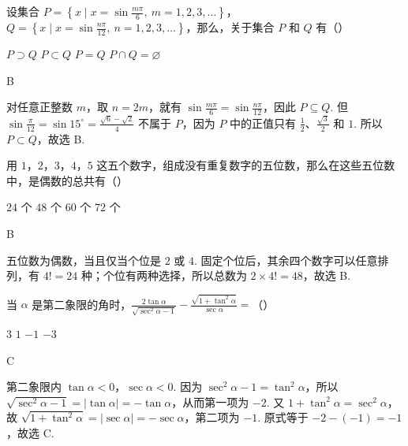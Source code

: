 \begin{problem}
设集合 \(P = \left\{x \mid x = \sin \frac{m\pi}{6},\ m = 1,2,3,\dots\right\}\)，\(Q = \left\{x \mid x = \sin \frac{n\pi}{12},\ n = 1,2,3,\dots\right\}\)，那么，关于集合 \(P\) 和 \(Q\) 有（\quad）

\choices
    {\(P \supset Q\)}
    {\(P \subset Q\)}
    {\(P = Q\)}
    {\(P \cap Q = \varnothing\)}
\end{problem}

\begin{answer}
B
\end{answer}

\begin{solution}
对任意正整数 \(m\)，取 \(n=2m\)，就有 \(\sin\frac{m\pi}{6}=\sin\frac{n\pi}{12}\)，因此 \(P\subseteq Q\). 但 \(\sin\frac{\pi}{12}=\sin15^\circ=\frac{\sqrt6-\sqrt2}{4}\) 不属于 \(P\)，因为 \(P\) 中的正值只有 \(\frac12\)、\(\frac{\sqrt3}{2}\) 和 \(1\). 所以 \(P\subset Q\)，故选 B.
\end{solution}

\begin{problem}
用 \(1\)，\(2\)，\(3\)，\(4\)，\(5\) 这五个数字，组成没有重复数字的五位数，那么在这些五位数中，是偶数的总共有（\quad）

\choices
    {\(24\) 个}
    {\(48\) 个}
    {\(60\) 个}
    {\(72\) 个}
\end{problem}

\begin{answer}
B
\end{answer}

\begin{solution}
五位数为偶数，当且仅当个位是 \(2\) 或 \(4\). 固定个位后，其余四个数字可以任意排列，有 \(4!=24\) 种；个位有两种选择，所以总数为 \(2\times4!=48\)，故选 B.
\end{solution}

\begin{problem}
当 \(\alpha\) 是第二象限的角时，\(\frac{2\tan \alpha}{\sqrt{\sec^2 \alpha - 1}} - \frac{\sqrt{1 + \tan^2 \alpha}}{\sec \alpha} =\)（\quad）

\choices
    {\(3\)}
    {\(1\)}
    {\(-1\)}
    {\(-3\)}
\end{problem}

\begin{answer}
C
\end{answer}

\begin{solution}
第二象限内 \(\tan\alpha<0\)，\(\sec\alpha<0\). 因为 \(\sec^2\alpha-1=\tan^2\alpha\)，所以 \(\sqrt{\sec^2\alpha-1}=|\tan\alpha|=-\tan\alpha\)，从而第一项为 \(-2\). 又 \(1+\tan^2\alpha=\sec^2\alpha\)，故 \(\sqrt{1+\tan^2\alpha}=|\sec\alpha|=-\sec\alpha\)，第二项为 \(-1\). 原式等于 \(-2-(-1)=-1\)，故选 C.
\end{solution}

